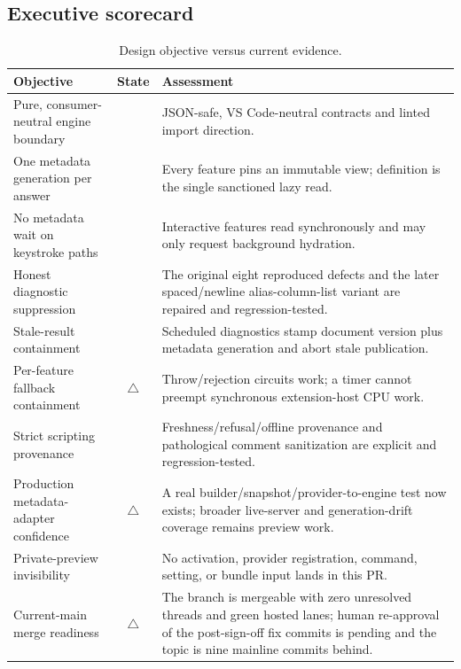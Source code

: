 \documentclass[11pt]{article}
\newcommand{\yes}{\textcolor{greenish}{\checkmark}}
\newcommand{\partialmark}{\textcolor{amber}{$\triangle$}}
\begin{document}
\subsection{Executive scorecard}

\begin{table}[H]
\centering
\small
\caption{Design objective versus current evidence.}
\label{tab:scorecard}
\begin{tabularx}{\textwidth}{@{}p{}cX@{}}
\toprule
\textbf{Objective} & \textbf{State} & \textbf{Assessment}\\
\midrule
Pure, consumer-neutral engine boundary & \yes & JSON-safe, VS Code-neutral contracts and linted import direction.\\
One metadata generation per answer & \yes & Every feature pins an immutable view; definition is the single sanctioned lazy read.\\
No metadata wait on keystroke paths & \yes & Interactive features read synchronously and may only request background hydration.\\
Honest diagnostic suppression & \yes & The original eight reproduced defects and the later spaced/newline alias-column-list variant are repaired and regression-tested.\\
Stale-result containment & \yes & Scheduled diagnostics stamp document version plus metadata generation and abort stale publication.\\
Per-feature fallback containment & \partialmark & Throw/rejection circuits work; a timer cannot preempt synchronous extension-host CPU work.\\
Strict scripting provenance & \yes & Freshness/refusal/offline provenance and pathological comment sanitization are explicit and regression-tested.\\
Production metadata-adapter confidence & \partialmark & A real builder/snapshot/provider-to-engine test now exists; broader live-server and generation-drift coverage remains preview work.\\
Private-preview invisibility & \yes & No activation, provider registration, command, setting, or bundle input lands in this PR.\\
Current-main merge readiness & \partialmark & The branch is mergeable with zero unresolved threads and green hosted lanes; human re-approval of the post-sign-off fix commits is pending and the topic is nine mainline commits behind.\\
\bottomrule
\end{tabularx}
\end{table}
\end{document}
